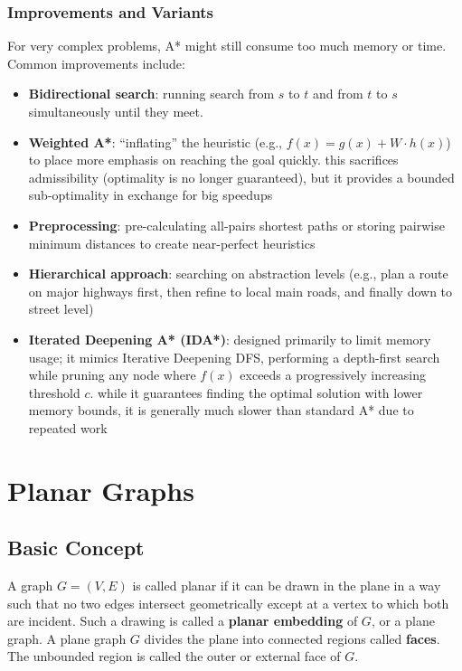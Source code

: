 \documentclass[a4paper, 11pt]{report}
\begin{document}
\subsection{Improvements and Variants}
For very complex problems, A* might still consume too much memory or time. Common improvements include:

\begin{itemize}
    \item \textbf{Bidirectional search}: running search from $s$ to $t$ and from $t$ to $s$ simultaneously until they meet.
    \item \textbf{Weighted A*}: ``inflating'' the heuristic (e.g., $f(x) = g(x) + W \cdot h(x)$) to place more emphasis on reaching the goal quickly.
        \subitem this sacrifices admissibility (optimality is no longer guaranteed), but it provides a bounded sub-optimality in exchange for big speedups
    \item \textbf{Preprocessing}: pre-calculating all-pairs shortest paths or storing pairwise minimum distances to create near-perfect heuristics
    \item \textbf{Hierarchical approach}: searching on abstraction levels (e.g., plan a route on major highways first, then refine to local main roads, and finally down to street level)
    \item \textbf{Iterated Deepening A* (IDA*)}: designed primarily to limit memory usage; it mimics Iterative Deepening DFS, performing a depth-first search while pruning any node where $f(x)$ exceeds a progressively increasing threshold $c$. 
        \subitem while it guarantees finding the optimal solution with lower memory bounds, it is generally much slower than standard A* due to repeated work
\end{itemize}

\chapter{Planar Graphs}

\section{Basic Concept}
A graph $G=(V,E)$ is called planar if it can be drawn in the plane in a way such that no two edges intersect geometrically except at a vertex to which both are incident. Such a drawing is called a \textbf{planar embedding} of $G$, or a plane graph. A plane graph $G$ divides the plane into connected regions called \textbf{faces}. The unbounded region is called the outer or external face of $G$.
\end{document}
